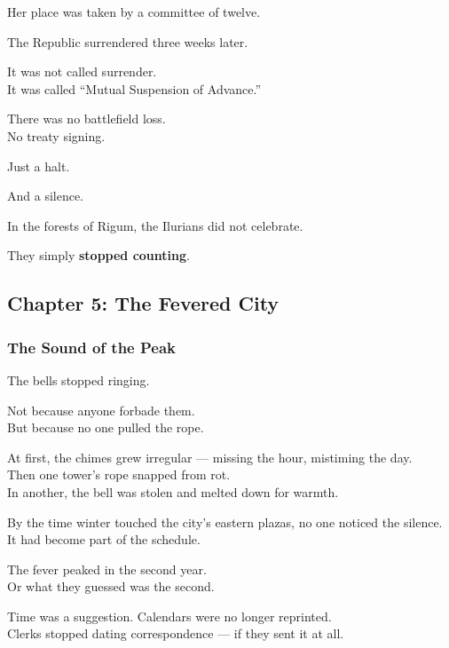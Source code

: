 \documentclass[12pt]{article}
\begin{document}
Her place was taken by a committee of twelve.

\vspace{1em}

The Republic surrendered three weeks later.

It was not called surrender.\\
It was called “Mutual Suspension of Advance.”

There was no battlefield loss.\\
No treaty signing.

Just a halt.

And a silence.

\vspace{1em}

In the forests of Rigum, the Ilurians did not celebrate.

They simply \textbf{stopped counting}.

\newpage

\subsection*{Chapter 5: The Fevered City}

\vspace{.5in}

\subsubsection*{The Sound of the Peak}

The bells stopped ringing.

Not because anyone forbade them.\\
But because no one pulled the rope.

At first, the chimes grew irregular — missing the hour, mistiming the day.\\
Then one tower’s rope snapped from rot.\\
In another, the bell was stolen and melted down for warmth.

By the time winter touched the city’s eastern plazas, no one noticed the silence.\\
It had become part of the schedule.

\vspace{1em}

The fever peaked in the second year.\\
Or what they guessed was the second.

Time was a suggestion. Calendars were no longer reprinted.\\
Clerks stopped dating correspondence — if they sent it at all.
\end{document}
